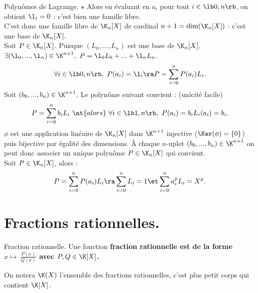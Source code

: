 \documentclass[11pt]{article}
\begin{document}
\begin{exercice}{Polynômes de Lagrange. $\star$}{}
    Alors en évaluant en $a_i$ pour tout $i\in\lb0,n\rb$, on obtient $\l_i = 0$ : c'est bien une famille libre.\\
    C'est donc une famille libre de $\K_n[X]$ de cardinal $n+1=\dim(\K_n[X])$ : c'est une base de $\K_n[X]$.\\
     Soit $P\in\K_n[X]$. Puisque $(L_0,...,L_n)$ est une base de $\K_n[X]$, $\exists (\l_0,...,\l_n)\in\K^{n+1}, ~ P=\l_0L_0+...+\l_nL_n$.
    \begin{equation*}
        \forall i \in \lb0,n\rb, ~ P(a_i) = \l_i \ra P = \sum_{i=0}^n P(a_i)L_i.
    \end{equation*}
     Soit $(b_0,...,b_n)\in\K^{n+1}$. Le polynôme suivant convient : (unicité facile)
    \begin{equation*}
        P = \sum_{i=0}^n b_iL_i ~ \nt{alors} ~ \forall i \in \lb 1, n\rb, ~ P(a_i) = b_iL_i(a_i) = b_i.
    \end{equation*}
     $\phi$ est une application linéaire de $\K_n[X]$ dans $\K^{n+1}$ injective ($\Ker(\phi)=\{0\}$) puis bijective par égalité des dimensions. À chaque $n$-uplet $(b_0,...,b_n)\in\K^{n+1}$ on peut donc associer un unique polynôme $P\in\K_n[X]$ qui convient.\\
     Soit $P\in\K_n[X]$, alors :
    \begin{equation*}
        P = \sum_{i=0}^nP(a_i)L_i \ra \sum_{i=0}^nL_i = 1 \et \sum_{i=0}^na_i^pL_i = X^p.
    \end{equation*}
\end{exercice}

\vspace*{-0.7cm}

\section{Fractions rationnelles.}

\begin{defi}{Fraction rationnelle.}{}
    Une fonction \bf{fraction rationnelle} est de la forme $x\mapsto~\frac{P(x)}{Q(x)}$ avec $P,Q\in\K[X]$.
\end{defi}

\vspace*{-0.7cm}

\begin{defi}{}{}
    On notera $\K(X)$ l'ensemble des fractions rationnelles, c'est plus petit corps qui contient $\K[X]$.
\end{defi}
\end{document}
